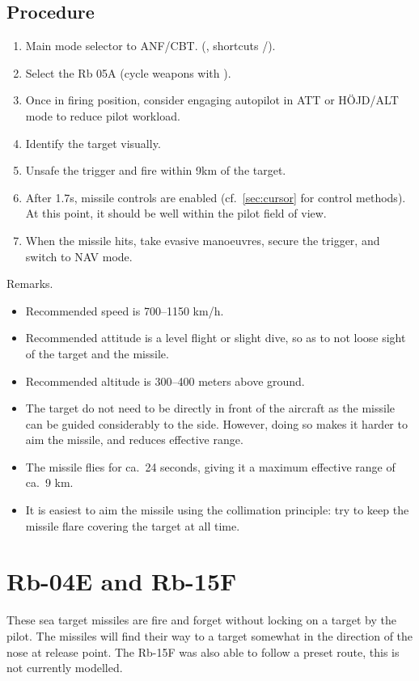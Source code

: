 \subsection{Procedure}
\begin{enumerate}
  \item Main mode selector to ANF/CBT.
    (, shortcuts /).
  \item Select the Rb 05A (cycle weapons with ).
  \item Once in firing position, consider engaging autopilot in ATT or HÖJD/ALT mode to reduce pilot workload.
  \item Identify the target visually.
  \item Unsafe the trigger and fire within 9km of the target.
  \item After 1.7s, missile controls are enabled
    (cf.\ \cref{sec:cursor} for control methods).
    At this point, it should be well within the pilot field of view.
  \item When the missile hits, take evasive manoeuvres, secure the trigger, and switch to NAV mode.
\end{enumerate}

Remarks.
\begin{itemize}
  \item Recommended speed is 700--1150 km/h.
  \item Recommended attitude is a level flight or slight dive,
    so as to not loose sight of the target and the missile.
  \item Recommended altitude is 300--400 meters above ground.
  \item The target do not need to be directly in front of the aircraft
    as the missile can be guided considerably to the side.
    However, doing so makes it harder to aim the missile, and reduces effective range.
  \item The missile flies for ca.\ 24 seconds, giving it a maximum effective range of ca.\ 9 km.
  \item It is easiest to aim the missile using the collimation principle:
    try to keep the missile flare covering the target at all time.
\end{itemize}

\section{Rb-04E and Rb-15F}
These sea target missiles are fire and forget without locking on a target by the pilot.
The missiles will find their way to a target somewhat in the direction of the nose at release point.
The Rb-15F was also able to follow a preset route, this is not currently modelled.

